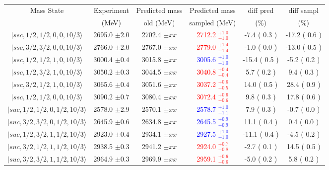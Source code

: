 \begin{tabular}{c | c  c  c  c  c}\hline \hline
Mass State & Experiment  &   Predicted mass  &    Predicted mass & diff pred & diff sampl\\ 
           & (MeV)       &   old (MeV)       &    sampled (MeV)  &     (\%) &     (\%)  \\ \hline
$\vert ssc,1/2,1/2,0,0,10/3 \rangle$ & 2695.0 $\pm 2.0 $  & 2702.4 $\pm xx$  & \textcolor{red}{ 2712.2  $^{+ 1.0 }_{ -1.0 }$}  &   -7.4 ( 0.3 )  &   -17.2 ( 0.6 ) \\  
$\vert ssc,3/2,3/2,0,0,10/3 \rangle$ & 2766.0 $\pm 2.0 $  & 2767.0 $\pm xx$  & \textcolor{red}{ 2779.0  $^{+ 1.4 }_{ -1.4 }$}  &   -1.0 ( 0.0 )  &   -13.0 ( 0.5 ) \\  
$\vert ssc,1/2,1/2,1,0,10/3 \rangle$ & 3000.4 $\pm 0.4 $  & 3015.8 $\pm xx$  & \textcolor{blue}{ 3005.6  $^{+ 1.0 }_{ -1.0 }$}  &   -15.4 ( 0.5 )  &   -5.2 ( 0.2 ) \\  
$\vert ssc,1/2,3/2,1,0,10/3 \rangle$ & 3050.2 $\pm 0.3 $  & 3044.5 $\pm xx$  & \textcolor{red}{ 3040.8  $^{+ 0.4 }_{ -0.4 }$}  &   5.7 ( 0.2 )  &   9.4 ( 0.3 ) \\  
$\vert ssc,3/2,1/2,1,0,10/3 \rangle$ & 3065.6 $\pm 0.4 $  & 3051.6 $\pm xx$  & \textcolor{red}{ 3037.2  $^{+ 0.6 }_{ -0.5 }$}  &   14.0 ( 0.5 )  &   28.4 ( 0.9 ) \\  
$\vert ssc,1/2,1/2,0,0,10/3 \rangle$ & 3090.2 $\pm 0.7 $  & 3080.4 $\pm xx$  & \textcolor{red}{ 3072.4  $^{+ 0.6 }_{ -0.6 }$}  &   9.8 ( 0.3 )  &   17.8 ( 0.6 ) \\  
$\vert suc,1/2,1/2,0,1/2,10/3 \rangle$ & 2578.0 $\pm 2.9 $  & 2570.1 $\pm xx$  & \textcolor{blue}{ 2578.7  $^{+ 1.0 }_{ -1.1 }$}  &   7.9 ( 0.3 )  &   -0.7 ( 0.0 ) \\  
$\vert suc,3/2,3/2,0,1/2,10/3 \rangle$ & 2645.9 $\pm 0.6 $  & 2634.8 $\pm xx$  & \textcolor{blue}{ 2645.5  $^{+ 0.9 }_{ -0.9 }$}  &   11.1 ( 0.4 )  &   0.4 ( 0.0 ) \\  
$\vert suc,1/2,3/2,1,1/2,10/3 \rangle$ & 2923.0 $\pm 0.4 $  & 2934.1 $\pm xx$  & \textcolor{blue}{ 2927.5  $^{+ 1.0 }_{ -1.0 }$}  &   -11.1 ( 0.4 )  &   -4.5 ( 0.2 ) \\  
$\vert suc,3/2,1/2,1,1/2,10/3 \rangle$ & 2938.5 $\pm 0.3 $  & 2941.2 $\pm xx$  & \textcolor{red}{ 2924.0  $^{+ 0.7 }_{ -0.8 }$}  &   -2.7 ( 0.1 )  &   14.5 ( 0.5 ) \\  
$\vert suc,3/2,3/2,1,1/2,10/3 \rangle$ & 2964.9 $\pm 0.3 $  & 2969.9 $\pm xx$  & \textcolor{red}{ 2959.1  $^{+ 0.6 }_{ -0.6 }$}  &   -5.0 ( 0.2 )  &   5.8 ( 0.2 ) \\  

\end{tabular}
